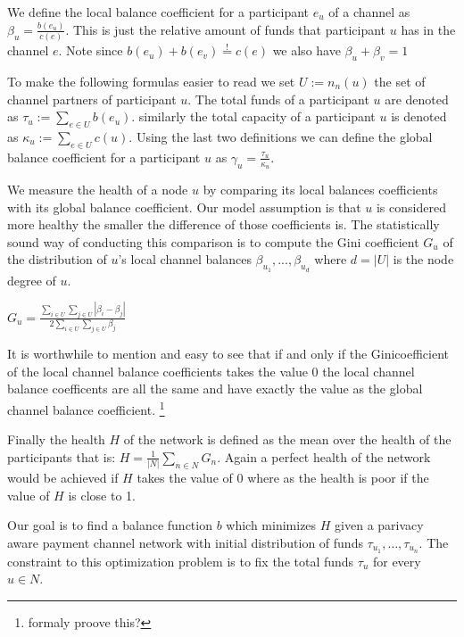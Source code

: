 \documentclass[a4paper]{paper}
\begin{document}
We define the local balance coefficient for a participant $e_u$ of a channel as  $\beta_u = \frac{b(e_u)}{c(e)}$.
This is just the relative amount of funds that participant $u$ has in the channel $e$.
Note since $b(e_u)+b(e_v)\stackrel{!}{=}c(e)$ we also have $\beta_u + \beta_v=1$

To make the following formulas easier to read we set $U:=n_n(u)$ the set of channel partners of participant $u$.
The total funds of a participant $u$ are denoted as $\tau_u:=\displaystyle{\sum_{e\in U}b(e_u)}$.
similarly the total capacity of a participant $u$ is denoted as $\kappa_u:=\displaystyle{\sum_{e\in U}c(u)}$.
Using the last two definitions we can define the global balance coefficient for a participant $u$ as $\gamma_u = \frac{\tau_u}{\kappa_u}$.

We measure the health of a node $u$ by comparing its local balances coefficients with its global balance coefficient.
Our model assumption is that $u$ is considered more healthy the smaller the difference of those coefficients is.
The statistically sound way of conducting this comparison is to compute the Gini coefficient $G_u$ of the distribution of $u$'s local channel balances $\beta_{u_1},...,\beta_{u_d}$ where $d=|U|$ is the node degree of $u$.

$G_u = \frac{\displaystyle{\sum_{i\in U} \sum_{j \in U}} | \beta_i - \beta_j |}{2 \displaystyle{\sum_{i \in U} \sum_{j \in U} \beta_j}}$

It is worthwhile to mention and easy to see that if and only if the Ginicoefficient of the local channel balance coefficients takes the value $0$ the local channel balance coefficents are all the same and have exactly the value as the global channel balance coefficient. \footnote{formaly proove this?}

Finally the health $H$ of the network is defined as the mean over the health of the participants that is: $H = \displaystyle{\frac{1}{|N|}\sum_{n\in N}G_n}$.
Again a perfect health of the network would be achieved if $H$ takes the value of $0$ where as the health is poor if the value of $H$ is close to 1. 

Our goal is to find a balance function $b$ which minimizes $H$ given a parivacy aware payment channel network with initial distribution of funds $\tau_{u_1},\dots,\tau_{u_n}$.
The constraint to this optimization problem is to fix the total funds $\tau_u$ for every $u \in N$.
\end{document}
